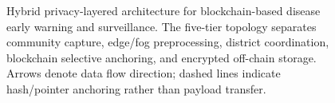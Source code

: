 \documentclass[AMA,LATO1COL]{WileyNJD-v2}
\begin{document}
\begin{figure}[!ht]
\centering
{}
\caption{Hybrid privacy-layered architecture for blockchain-based disease early warning and surveillance. The five-tier topology separates community capture, edge/fog preprocessing, district coordination, blockchain selective anchoring, and encrypted off-chain storage. Arrows denote data flow direction; dashed lines indicate hash/pointer anchoring rather than payload transfer.}\label{fig:architecture}
\end{figure}
%
%
%
%
%
%
%
\end{document}
